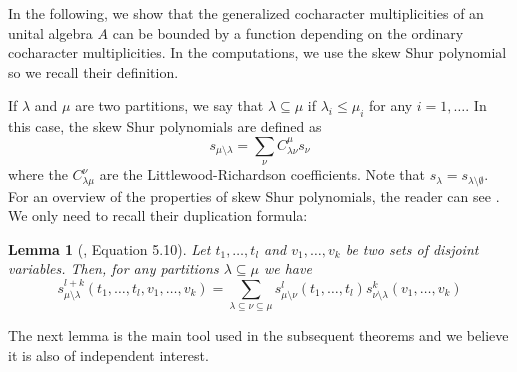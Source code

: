 \documentclass{article}
\newtheorem{lemma}[theorem]{Lemma}
\begin{document}
	In the following, we show that the generalized cocharacter multiplicities of an unital algebra $A$ can be bounded by a function depending on the ordinary cocharacter multiplicities. In the computations, we use the skew Shur polynomial so we recall their definition. 
    
	If $\lambda$ and $\mu$ are two partitions, we say that $\lambda\subseteq \mu $ if $\lambda_i\leq \mu_i$ for any $i=1,\dots$. In this case, the skew Shur polynomials are defined as 
	\[ s_{\mu\setminus\lambda} = \sum_{\nu} C^\mu_{\lambda\nu} s_\nu \] 
	where the $C^\nu_{\lambda\mu}$ are the Littlewood-Richardson coefficients.
	Note that $s_{\lambda}=s_{\lambda\setminus\emptyset}$. For an overview of the properties of skew Shur polynomials, the reader can see \cite{Mac98, Mel17}. We only need to recall their duplication formula:
	
	\begin{lemma}[\cite{Mac98}, Equation 5.10]\label{lem: duplication}
		Let $t_1,\dots,t_l$ and $v_1,\dots,v_k$ be two sets of disjoint variables. Then, for any partitions $\lambda\subseteq\mu$ we have
		\[ s^{l+k}_{\mu\setminus\lambda}(t_1,\dots,t_l,v_1,\dots,v_k) = \sum_{\lambda\subseteq \nu\subseteq \mu} s^l_{\mu\setminus\nu}(t_1,\dots,t_l) s^k_{\nu\setminus\lambda}(v_1,\dots,v_k) \]
	\end{lemma}
	
	The next lemma is the main tool used in the subsequent theorems and we believe it is also of independent interest.
\end{document}

